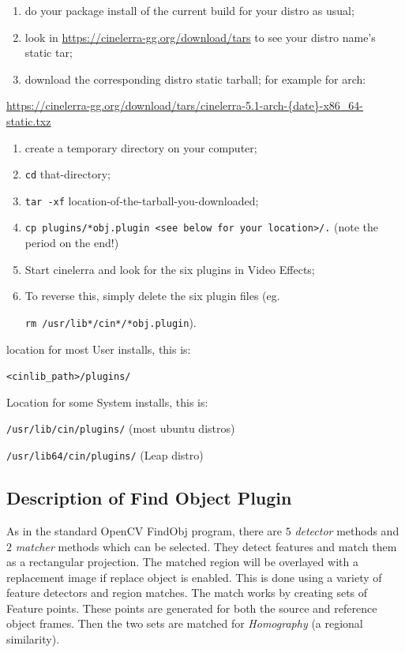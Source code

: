 \begin{enumerate}
    \item do your package install of the current build for your distro as usual;
    \item look in \url{https://cinelerra-gg.org/download/tars} to see your distro name's static tar;
    \item download the corresponding distro static tarball;
    for example for arch:
\end{enumerate}    
    \url{https://cinelerra-gg.org/download/tars/cinelerra-5.1-arch-{date}-x86_64-static.txz}
\begin{enumerate}[resume]
    \item create a temporary directory on your computer;
    \item \texttt{cd} that-directory;
    \item \texttt{tar -xf} location-of-the-tarball-you-downloaded;
    \item \texttt{cp plugins/*obj.plugin <see below for your location>/.} (note the period on the end!)
    \item Start cinelerra and look for the six plugins in Video Effects;
    \item To reverse this, simply delete the six plugin files (eg.
       
    \texttt{rm /usr/lib*/cin*/*obj.plugin}).
\end{enumerate}

location for most User installs, this is:

\texttt{<cinlib\_path>/plugins/}

Location for some System installs, this is:

\texttt{/usr/lib/cin/plugins/} (most ubuntu distros)

\texttt{/usr/lib64/cin/plugins/} (Leap distro)

\subsection{Description of Find Object Plugin}%
\label{sub:description_findobj_plugin}

As in the standard OpenCV FindObj program, there are $5$ \textit{detector} methods and $2$ \textit{matcher} methods which can be selected. They detect features and match them as a rectangular projection. The matched region will be overlayed with a replacement image if replace object is enabled. This is done using a variety of feature detectors and region matches. The match works by creating sets of Feature points. These points are generated for both the source and reference object frames. Then the two sets are matched for \textit{Homography} (a regional similarity).

